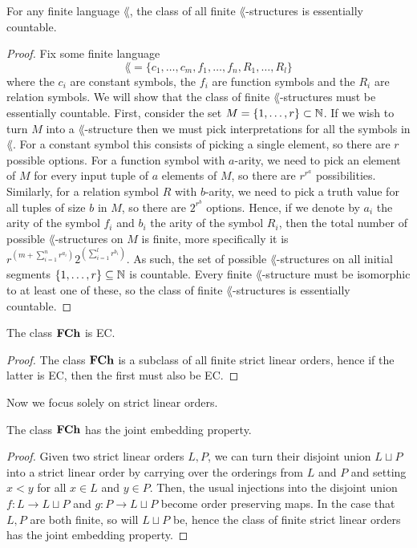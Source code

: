 \begin{prop}
  For any finite language $\lang$, the class of all finite $\lang$-structures is essentially
  countable.
\end{prop}
\begin{proof}
  Fix some finite language
  \begin{equation*}
    \lang = \{c_1, \dots, c_m, f_1, \dots, f_n, R_1, \dots, R_l \}
  \end{equation*}
  where the $c_i$ are constant symbols, the $f_i$ are function symbols and the $R_i$ are relation
  symbols. We will show that the class of finite $\lang$-structures must be essentially countable.
  First, consider the set $M = \{1,\dots,r\} \subset \mathbb{N}$. If we wish to turn $M$ into a
  $\lang$-structure then we must pick interpretations for all the symbols in $\lang$. For a constant
  symbol this consists of picking a single element, so there are $r$ possible options. For a
  function symbol with $a$-arity, we need to pick an element of $M$ for every input tuple of $a$
  elements of $M$, so there are $r^{r^a}$ possibilities. Similarly, for a relation symbol $R$ with
  $b$-arity, we need to pick a truth value for all tuples of size $b$ in $M$, so there are $2^{r^b}$
  options. Hence, if we denote by $a_i$ the arity of the symbol $f_i$ and $b_i$ the arity of the
  symbol $R_i$, then the total number of possible $\lang$-structures on $M$ is finite, more
  specifically it is
  $r^{\left(m + \sum_{i=1}^{n} r^{a_i}\right)}2^{\left(\sum_{i=1}^{l} r^{b_i}\right)}$.
  As such, the set of
  possible $\lang$-structures on all initial segments $\{1,\dots,r\} \subseteq \mathbb{N}$ is countable.
  Every finite $\lang$-structure must be isomorphic to at least one of these, so the class of finite
  $\lang$-structures is essentially countable.
\end{proof}

\begin{cor}
  The class $\textbf{FCh}$ is EC.
\end{cor}
\begin{proof}
  The class $\textbf{FCh}$ is a subclass of all finite strict linear orders, hence if the latter is EC,
  then the first must also be EC.
\end{proof}

Now we focus solely on strict linear orders.

\begin{prop}
  The class $\textbf{FCh}$ has the joint embedding property.
\end{prop}
\begin{proof}
  Given two strict linear orders $L,P$, we can turn their disjoint union $L \sqcup P$ into a
  strict linear order by carrying over the orderings from $L$ and $P$ and setting
  $x < y$ for all $x \in L$ and $y \in P$. Then, the usual injections into the disjoint union
  $f : L \to L \sqcup P$ and $g : P \to L \sqcup P$ become order preserving maps. In the case
  that $L,P$ are both finite, so will $L \sqcup P$ be, hence the class of finite strict
  linear orders has the joint embedding property.
\end{proof}

